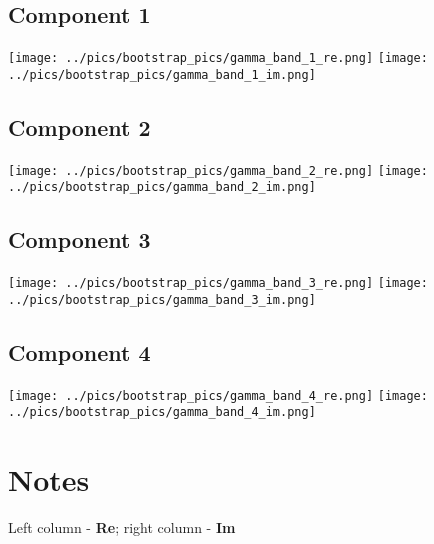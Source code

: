 \documentclass{article}
\begin{document}
\subsection*{Component 1}
\texttt{[image: ../pics/bootstrap\_pics/gamma\_band\_1\_re.png]}
\hspace{2cm}
\texttt{[image: ../pics/bootstrap\_pics/gamma\_band\_1\_im.png]}

\subsection*{Component 2}
\texttt{[image: ../pics/bootstrap\_pics/gamma\_band\_2\_re.png]}
\hspace{2cm}
\texttt{[image: ../pics/bootstrap\_pics/gamma\_band\_2\_im.png]}

\subsection*{Component 3}
\texttt{[image: ../pics/bootstrap\_pics/gamma\_band\_3\_re.png]}
\hspace{2cm}
\texttt{[image: ../pics/bootstrap\_pics/gamma\_band\_3\_im.png]}

\subsection*{Component 4}
\texttt{[image: ../pics/bootstrap\_pics/gamma\_band\_4\_re.png]}
\hspace{2cm}
\texttt{[image: ../pics/bootstrap\_pics/gamma\_band\_4\_im.png]}


\justify
\section{Notes}
Left column - \textbf{Re}; right column - \textbf{Im}
\end{document}
